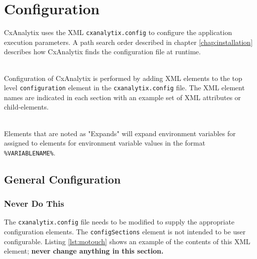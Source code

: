 \chapter{Configuration}\label{chap:configuration}


\newcommand{\configelement}[2]{\paragraph{XML Element: #1, Expands: #2}}

CxAnalytix uses the XML \texttt{cxanalytix.config} to configure the application execution parameters.  A path search order described in chapter \ref{chap:installation}
describes how CxAnalytix finds the configuration file at runtime.

\noindent\\Configuration of CxAnalytix is performed by adding XML elements to the top level \texttt{configuration} element in the
\texttt{cxanalytix.config} file.  The XML element names are indicated in each section with an example set of XML attributes or child-elements.

\noindent\\Elements that are noted as "Expands" will expand environment variables for assigned to elements for environment variable values in the
format \texttt{\%VARIABLENAME\%}.  

\section{General Configuration}\label{sec:general}

\subsection{Never Do This}

The \texttt{cxanalytix.config} file needs to be modified to supply the appropriate configuration elements.  The \texttt{configSections}
element is not intended to be user configurable.  Listing \ref{lst:motouch} shows an example of the contents of this XML element;
\textbf{never change anything in this section.}

